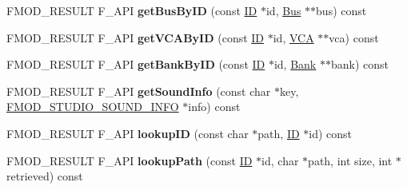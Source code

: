 \begin{DoxyCompactItemize}
\item 
\hypertarget{class_f_m_o_d_1_1_studio_1_1_system_ac44c6d2c39be073e288ea42d5faf7235}{F\+M\+O\+D\+\_\+\+R\+E\+S\+U\+L\+T F\+\_\+\+A\+P\+I {\bfseries get\+Bus\+By\+I\+D} (const \hyperlink{struct_f_m_o_d___g_u_i_d}{I\+D} $\ast$id, \hyperlink{class_f_m_o_d_1_1_studio_1_1_bus}{Bus} $\ast$$\ast$bus) const }\label{class_f_m_o_d_1_1_studio_1_1_system_ac44c6d2c39be073e288ea42d5faf7235}

\item 
\hypertarget{class_f_m_o_d_1_1_studio_1_1_system_a9ff31ecb7d4ca37657f1b26a451e8c51}{F\+M\+O\+D\+\_\+\+R\+E\+S\+U\+L\+T F\+\_\+\+A\+P\+I {\bfseries get\+V\+C\+A\+By\+I\+D} (const \hyperlink{struct_f_m_o_d___g_u_i_d}{I\+D} $\ast$id, \hyperlink{class_f_m_o_d_1_1_studio_1_1_v_c_a}{V\+C\+A} $\ast$$\ast$vca) const }\label{class_f_m_o_d_1_1_studio_1_1_system_a9ff31ecb7d4ca37657f1b26a451e8c51}

\item 
\hypertarget{class_f_m_o_d_1_1_studio_1_1_system_a2bb2abb1978e8a06ebb645ef55654040}{F\+M\+O\+D\+\_\+\+R\+E\+S\+U\+L\+T F\+\_\+\+A\+P\+I {\bfseries get\+Bank\+By\+I\+D} (const \hyperlink{struct_f_m_o_d___g_u_i_d}{I\+D} $\ast$id, \hyperlink{class_f_m_o_d_1_1_studio_1_1_bank}{Bank} $\ast$$\ast$bank) const }\label{class_f_m_o_d_1_1_studio_1_1_system_a2bb2abb1978e8a06ebb645ef55654040}

\item 
\hypertarget{class_f_m_o_d_1_1_studio_1_1_system_a3a7ebf1cd2fe0dd391ba21a07bd3b84e}{F\+M\+O\+D\+\_\+\+R\+E\+S\+U\+L\+T F\+\_\+\+A\+P\+I {\bfseries get\+Sound\+Info} (const char $\ast$key, \hyperlink{struct_f_m_o_d___s_t_u_d_i_o___s_o_u_n_d___i_n_f_o}{F\+M\+O\+D\+\_\+\+S\+T\+U\+D\+I\+O\+\_\+\+S\+O\+U\+N\+D\+\_\+\+I\+N\+F\+O} $\ast$info) const }\label{class_f_m_o_d_1_1_studio_1_1_system_a3a7ebf1cd2fe0dd391ba21a07bd3b84e}

\item 
\hypertarget{class_f_m_o_d_1_1_studio_1_1_system_abdd91ef56975982cdd63f2de1df74b3c}{F\+M\+O\+D\+\_\+\+R\+E\+S\+U\+L\+T F\+\_\+\+A\+P\+I {\bfseries lookup\+I\+D} (const char $\ast$path, \hyperlink{struct_f_m_o_d___g_u_i_d}{I\+D} $\ast$id) const }\label{class_f_m_o_d_1_1_studio_1_1_system_abdd91ef56975982cdd63f2de1df74b3c}

\item 
\hypertarget{class_f_m_o_d_1_1_studio_1_1_system_abf6972857d92dd2a99baba258c160cc4}{F\+M\+O\+D\+\_\+\+R\+E\+S\+U\+L\+T F\+\_\+\+A\+P\+I {\bfseries lookup\+Path} (const \hyperlink{struct_f_m_o_d___g_u_i_d}{I\+D} $\ast$id, char $\ast$path, int size, int $\ast$retrieved) const }\label{class_f_m_o_d_1_1_studio_1_1_system_abf6972857d92dd2a99baba258c160cc4}


\end{DoxyCompactItemize}
